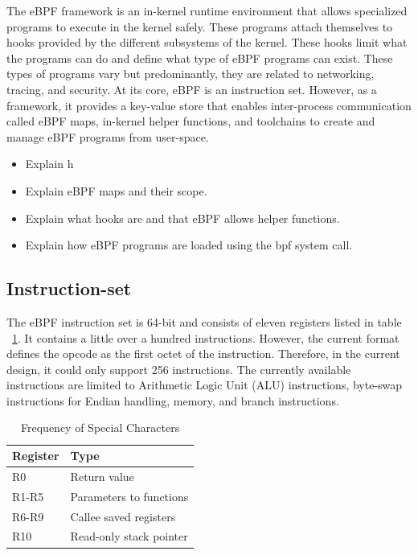 \documentclass[sigconf, nonacm]{acmart}
\begin{document}
The eBPF framework is an in-kernel runtime environment that allows specialized
programs to execute in the kernel safely. These programs attach themselves to
hooks provided by the different subsystems of the kernel. These hooks limit what
the programs can do and define what type of eBPF programs can exist. These types
of programs vary but predominantly, they are related to networking, tracing, and
security. At its core, eBPF is an instruction set. However, as a framework, it
provides a key-value store that enables inter-process communication called eBPF
maps, in-kernel helper functions, and toolchains to create and manage eBPF
programs from user-space.


\begin{itemize}
  \item Explain h
  \item Explain eBPF maps and their scope.
  \item Explain what hooks are and that eBPF allows helper functions.
  \item Explain how eBPF programs are loaded using the bpf system call.
\end{itemize}


\subsection{Instruction-set}


The eBPF instruction set is 64-bit and consists of eleven registers listed in
table ~\ref{table:eBPF_registers}. It contains a little over a hundred
instructions. However, the current format defines the opcode as the first octet
of the instruction. Therefore, in the current design, it could only support 256
instructions. The currently available instructions are limited to Arithmetic
Logic Unit (ALU) instructions, byte-swap instructions for Endian handling,
memory, and branch instructions.

\begin{table}
  \caption{Frequency of Special Characters}
  \label{tab:freq}
  \begin{tabular}{ll}
    \toprule
    Register & Type                    \\
    \midrule
    R0       & Return value            \\
    R1-R5    & Parameters to functions \\
    R6-R9    & Callee saved registers  \\
    R10      & Read-only stack pointer \\
    \bottomrule
\end{tabular}
\label{table:eBPF_registers}
\end{table}
\end{document}
